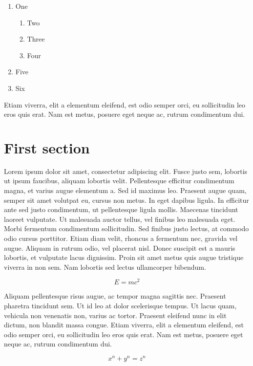 \documentclass[10pt,a4paper,twoside,twocolumn]{article}
\begin{document}
\begin{enumerate}
  \item One
    \begin{enumerate}
      \item Two
      \item Three
      \item Four
  \end{enumerate}
  \item Five
  \item Six
\end{enumerate}

Etiam viverra, elit a elementum eleifend, est odio semper orci, eu sollicitudin leo eros quis erat. Nam est metus, posuere eget neque ac, rutrum condimentum dui.

\section{First section}

Lorem ipsum dolor sit amet, consectetur adipiscing elit. Fusce justo sem, lobortis ut ipsum faucibus, aliquam lobortis velit. Pellentesque efficitur condimentum magna, et varius augue elementum a. Sed id maximus leo. Praesent augue quam, semper sit amet volutpat eu, cursus non metus. In eget dapibus ligula. In efficitur ante sed justo condimentum, ut pellentesque ligula mollis. Maecenas tincidunt laoreet vulputate. Ut malesuada auctor tellus, vel finibus leo malesuada eget. Morbi fermentum condimentum sollicitudin. Sed finibus justo lectus, at commodo odio cursus porttitor. Etiam diam velit, rhoncus a fermentum nec, gravida vel augue. Aliquam in rutrum odio, vel placerat nisl. Donec suscipit est a mauris lobortis, et vulputate lacus dignissim. Proin sit amet metus quis augue tristique viverra in non sem. Nam lobortis sed lectus ullamcorper bibendum.

\begin{equation}
E=mc^2
\end{equation}

Aliquam pellentesque risus augue, ac tempor magna sagittis nec. Praesent pharetra tincidunt sem. Ut id leo at dolor scelerisque tempus. Ut lacus quam, vehicula non venenatis non, varius ac tortor. Praesent eleifend nunc in elit dictum, non blandit massa congue. Etiam viverra, elit a elementum eleifend, est odio semper orci, eu sollicitudin leo eros quis erat. Nam est metus, posuere eget neque ac, rutrum condimentum dui.

\[ x^n + y^n = z^n \]
\end{document}
